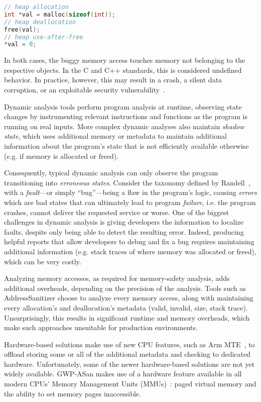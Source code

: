 \begin{lstlisting}[language=C, frame=single, xleftmargin=0.5em,
xrightmargin=0.5em, caption=Use-after-free example., label=lst:uaf]
// heap allocation
int *val = malloc(sizeof(int));
// heap deallocation
free(val);
// heap use-after-free
*val = 0;
\end{lstlisting}

In both cases, the buggy memory access touches memory not belonging to the
respective objects. In the C and C++ standards, this is considered undefined
behavior. In practice, however, this may result in a crash, a silent data
corruption, or an exploitable security vulnerability~\cite{SzekeresPWS2013}.

 Dynamic analysis tools perform program analysis at
runtime, observing state changes by instrumenting relevant instructions and
functions as the program is running on real inputs. More complex dynamic
analyses also maintain \emph{shadow state}, which uses additional memory or
metadata to maintain additional information about the program's state that is
not efficiently available otherwise (e.g. if memory is allocated or freed).

Consequently, typical dynamic analysis can only observe the program
transitioning into \emph{erroneous states}.  Consider the taxonomy defined by
Randell~\cite{Randell2003}, with a \emph{fault}---or simply ``bug''---being a
flaw in the program's logic, causing \emph{errors} which are bad states that
can ultimately lead to program \emph{failure}, i.e. the program crashes, cannot
deliver the requested service or worse. One of the biggest challenges in
dynamic analysis is giving developers the information to localize faults,
despite only being able to detect the resulting error. Indeed, producing
helpful reports that allow developers to debug and fix a bug requires
maintaining additional information (e.g. stack traces of where memory was
allocated or freed), which can be very costly.

Analyzing memory accesses, as required for memory-safety analysis, adds
additional overheads, depending on the precision of the analysis. Tools such as
AddressSanitizer choose to analyze every memory access, along with maintaining
every allocation's and deallocation's metadata (valid, invalid, size, stack
trace).  Unsurprisingly, this results in significant runtime and memory
overheads, which make such approaches unsuitable for production environments.

Hardware-based solutions make use of new CPU features, such as Arm
MTE~\cite{Serebryany2019}, to offload storing some or all of the additional
metadata and checking to dedicated hardware. Unfortunately, some of the newer
hardware-based solutions are not yet widely available. GWP-ASan makes use of a
hardware feature available in all modern CPUs' Memory Management Units
(MMUs)~\cite{CAR}: paged virtual memory and the ability to set memory pages
inaccessible.
